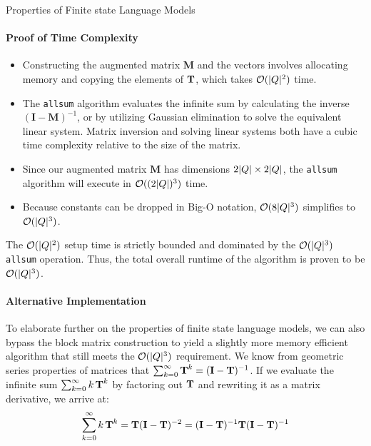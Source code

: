 \begin{question}{Properties of Finite state Language Models}
\begin{subquestion}
\paragraph{Proof of Time Complexity}

\begin{itemize}
    \item Constructing the augmented matrix $\mathbf{M}$ and the vectors involves allocating memory and copying the elements of $\transMtx$, which takes $\bigo(|\states|^2)$ time.
    \item The \texttt{allsum} algorithm evaluates the infinite sum by calculating the inverse $(\mathbf{I} - \mathbf{M})^{-1}$, or by utilizing Gaussian elimination to solve the equivalent linear system. Matrix inversion and solving linear systems both have a cubic time complexity relative to the size of the matrix.
    \item Since our augmented matrix $\mathbf{M}$ has dimensions $2|\states| \times 2|\states|$, the \texttt{allsum} algorithm will execute in $\bigo((2|\states|)^3)$ time.
    \item Because constants can be dropped in Big-O notation, $\bigo(8|\states|^3)$ simplifies to $\bigo(|\states|^3)$.
\end{itemize}
The $\bigo(|\states|^2)$ setup time is strictly bounded and dominated by the $\bigo(|\states|^3)$ \texttt{allsum} operation. Thus, the total overall runtime of the algorithm is proven to be $\bigo(|\states|^3)$.

\paragraph{Alternative Implementation}

To elaborate further on the properties of finite state language models, we can also bypass the block matrix construction to yield a slightly more memory efficient algorithm that still meets the $\bigo(|\states|^3)$ requirement. 
We know from geometric series properties of matrices that $\sum_{k=0}^{\infty} \transMtx^k = (\mathbf{I} - \transMtx)^{-1}$. 
If we evaluate the infinite sum $\sum_{k=0}^{\infty} k\, \transMtx^k$ by factoring out $\transMtx$ and rewriting it as a matrix derivative, we arrive at:
\begin{equation}
    \sum_{k=0}^{\infty} k\, \transMtx^k = \transMtx (\mathbf{I} - \transMtx)^{-2} = (\mathbf{I} - \transMtx)^{-1} \transMtx (\mathbf{I} - \transMtx)^{-1}
\end{equation}


\end{subquestion}
\end{question}
